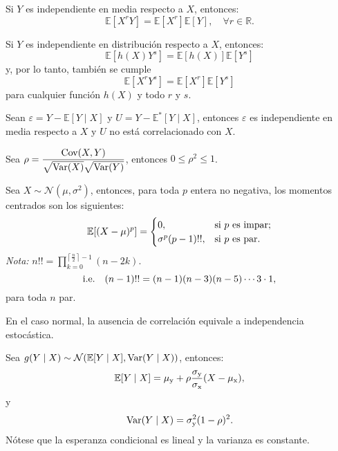 \documentclass[8pt,a4paper]{extarticle}
\begin{document}
\begin{multicols}{3}
	\begin{boxprop}[]
		Si $Y$ es independiente en media respecto a $X$, entonces:
		\[
			\mathbb{E}[X^r Y] = \mathbb{E}[X^r] \mathbb{E}[Y], \quad \forall r\in \mathbb{R}
			.\]
	\end{boxprop}

	\begin{boxprop}[]
		Si $Y$ es independiente en distribución respecto a $X$, entonces:
		\[
			\mathbb{E}[h(X) Y^s] = \mathbb{E}[h(X)] \mathbb{E}[Y^s]
		\]
		y, por lo tanto, también se cumple
		\[
			\mathbb{E}[X^r Y^s] = \mathbb{E}[X^r] \mathbb{E}[Y^s]
		\]
		para cualquier función $h(X)$ y todo $r$ y $s$.
	\end{boxprop}

	\begin{boxprop}
		Sean $\varepsilon = Y - \mathbb{E} [Y \mid X]$ y $U = Y - \mathbb{E}^* [Y \mid X]$, entonces $\varepsilon$ es independiente en media respecto a $X$ y $U$ no está correlacionado con $X$.
	\end{boxprop}

	\newpage

	\begin{boxtheo}
		Sea $\displaystyle \rho = \frac{\text{\normalfont Cov}(X,Y)}{\sqrt{\text{\normalfont Var}(X)} \sqrt{\text{\normalfont Var}(Y)}}$, entonces $0 \leq \rho^{2} \leq 1$.
	\end{boxtheo}

	\begin{boxprop}
		Sea $X \sim \mathcal{N} (\mu,\sigma^{2})$, entonces, para toda $p$ entera no negativa, los momentos centrados son los siguientes:
		\[\mathbb{E} [(X - \mu)^{p}] =
			\begin{cases}
				0,                 & \text{si $p$ es impar}; \\
				\sigma^{p}(p-1)!!, & \text{si $p$ es par.}
			\end{cases} \]
		\emph{Nota:} $\displaystyle n!! = \prod_{k = 0}^{\left\lceil \frac{n}{2} \right\rceil - 1} (n - 2k)$. \[\text{\normalfont i.e.} \quad (n -1)!! = (n -1)(n - 3)(n - 5) \cdots 3 \cdot 1,\] para toda $n$ par.
	\end{boxprop}

	\begin{boxprop}
		En el caso normal, la ausencia de correlación equivale a independencia estocástica.
	\end{boxprop}

	\begin{boxprop}
		Sea $g(Y \mid X) \sim \mathcal{N}(\mathbb{E}[Y \mid X], \text{\normalfont Var}(Y \mid X))$, entonces:
		\[\mathbb{E} [Y \mid X] = \mu_{\mathrm{y}} + \rho \frac{\sigma_{\mathrm{y}}}{\sigma_{\mathrm{x}}} (X - \mu_{\mathrm{x}}),\]
		y
		\[\text{\normalfont Var}(Y \mid X) = \sigma_{\mathrm{y}}^{2} (1 - \rho)^2.\]
		Nótese que la esperanza condicional es lineal y la varianza es constante.
	\end{boxprop}


\end{multicols}
\end{document}
